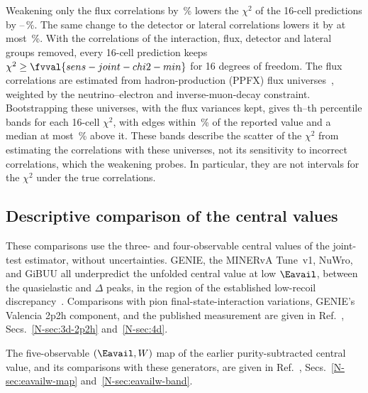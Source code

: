 Weakening only the flux correlations by \,\% lowers the $\chi^2$ of the 16-cell predictions by
--\,\%.
The same change to the detector or lateral correlations lowers it by at most \,\%.
With the correlations of the interaction, flux, detector and lateral groups removed, every 16-cell prediction keeps
$\chi^2\geq\fvval{sens-joint-chi2-min}$ for 16 degrees of freedom.
The flux correlations are estimated from  hadron-production (PPFX) flux
universes~\cite{MINERvA:2016iqn}, weighted by the neutrino--electron and inverse-muon-decay constraint.
Bootstrapping these universes, with the flux variances kept, gives th--th percentile
bands for each 16-cell $\chi^2$, with edges within \,\% of the reported value and a median at
most \,\% above it.
These bands describe the scatter of the $\chi^2$ from estimating the correlations with these universes, not its
sensitivity to incorrect correlations, which the weakening probes.
In particular, they are not intervals for the $\chi^2$ under the true correlations.

\subsection{Descriptive comparison of the central values}
\label{sec:central}

These comparisons use the three- and four-observable central values of the joint-test estimator, without
uncertainties.
GENIE, the MINERvA Tune~v1, NuWro, and GiBUU all underpredict the unfolded central value at low $\Eavail$, between
the quasielastic and $\Delta$ peaks, in the region of the established low-recoil
discrepancy~\cite{MINERvA:2016lowrecoil,MINERvA:2022incl}.
Comparisons with pion final-state-interaction variations, GENIE's Valencia 2p2h component, and the published
measurement are given in Ref.~\cite{AnalysisNote2026}, Secs.~\ref*{N-sec:3d-2p2h} and~\ref*{N-sec:4d}.

The five-observable $(\Eavail,W)$ map of the earlier purity-subtracted central value, and its comparisons with these
generators, are given in Ref.~\cite{AnalysisNote2026}, Secs.~\ref*{N-sec:eavailw-map} and~\ref*{N-sec:eavailw-band}.
